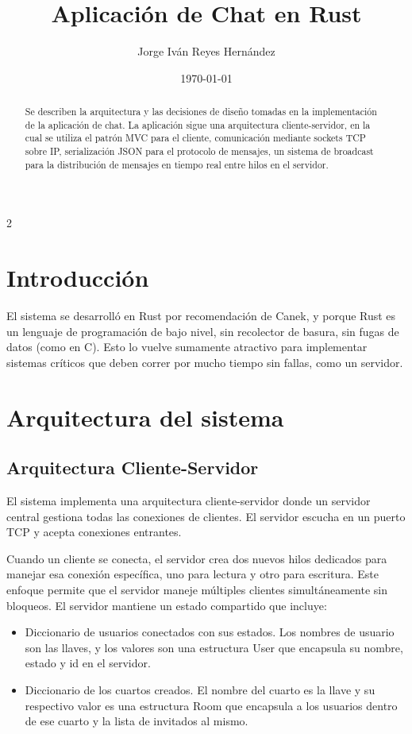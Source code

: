 \documentclass[letter,11pt]{article}
\title{Aplicación de Chat en Rust}
\author{Jorge Iván Reyes Hernández}
\date{\today}
\begin{document}
\maketitle

\begin{abstract}
Se describen la arquitectura y las decisiones de diseño tomadas en la implementación de la aplicación de chat.
La aplicación sigue una arquitectura cliente-servidor, en la cual se utiliza el patrón MVC para el cliente, comunicación mediante sockets TCP sobre IP, serialización JSON para el protocolo de mensajes, un sistema de broadcast para la distribución de mensajes en tiempo real entre hilos en el servidor.
\end{abstract}

\begin{multicols}{2}

\section{Introducción}

El sistema se desarrolló en Rust por recomendación de Canek, y porque Rust es un lenguaje de programación de bajo nivel, sin recolector de basura, sin fugas de datos (como en C). Esto lo vuelve sumamente atractivo para implementar sistemas críticos que deben correr por mucho tiempo sin fallas, como un servidor.


\section{Arquitectura del sistema}

\subsection{Arquitectura Cliente-Servidor}

El sistema implementa una arquitectura cliente-servidor donde un servidor central gestiona todas las conexiones de clientes. El servidor escucha en un puerto TCP y acepta conexiones entrantes.

Cuando un cliente se conecta, el servidor crea dos nuevos hilos dedicados para manejar esa conexión específica, uno para lectura y otro para escritura. Este enfoque permite que el servidor maneje múltiples clientes simultáneamente sin bloqueos. El servidor mantiene un estado compartido que incluye:

\begin{itemize}
    \item Diccionario de usuarios conectados con sus estados. Los nombres de usuario son las llaves, y los valores son una estructura User que encapsula su nombre, estado y id en el servidor.
    \item Diccionario de los cuartos creados. El nombre del cuarto es la llave y su respectivo valor es una estructura Room que encapsula a los usuarios dentro de ese cuarto y la lista de invitados al mismo.
\end{itemize}


\end{multicols}
\end{document}

